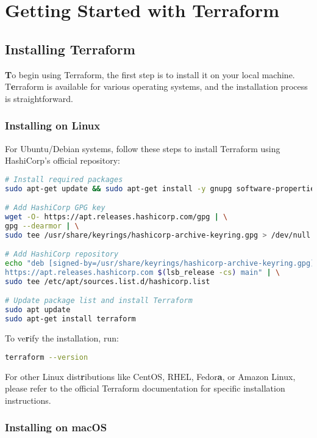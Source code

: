 \chapter{Getting Started with Terraform}

\sloppy

\section{Installing Terraform}

\textbf{T}o begin using Terraform, the first step is to install it on your local machine. T\textbf{e}rraform is available for various operating systems, and the installation process is straightforward.

\subsection{Installing on Linux}

For Ubuntu/Debian systems, follow these steps to install Terraform using HashiCorp's official repository:

\begin{lstlisting}[language=bash]
# Install required packages
sudo apt-get update && sudo apt-get install -y gnupg software-properties-common

# Add HashiCorp GPG key
wget -O- https://apt.releases.hashicorp.com/gpg | \
gpg --dearmor | \
sudo tee /usr/share/keyrings/hashicorp-archive-keyring.gpg > /dev/null

# Add HashiCorp repository
echo "deb [signed-by=/usr/share/keyrings/hashicorp-archive-keyring.gpg] \
https://apt.releases.hashicorp.com $(lsb_release -cs) main" | \
sudo tee /etc/apt/sources.list.d/hashicorp.list

# Update package list and install Terraform
sudo apt update
sudo apt-get install terraform
\end{lstlisting}

To ve\textbf{r}ify the installation, run:
\begin{lstlisting}[language=bash]
terraform --version
\end{lstlisting}

For other Linux dist\textbf{r}ibutions like CentOS, RHEL, Fedor\textbf{a}, or Amazon Linux, please refer to the official Terraform documentation for specific installation instructions.

\subsection{Installing on macOS}

